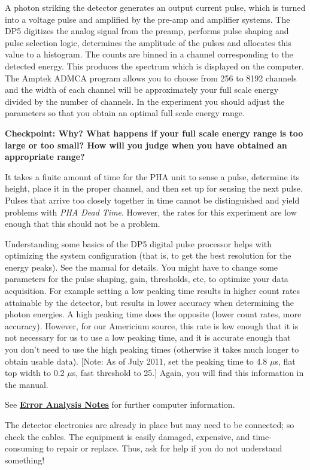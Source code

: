 \documentclass{../lab}
\begin{document}
A photon striking the detector generates an output current pulse, which is turned into a voltage pulse and amplified by the pre-amp and amplifier systems. The DP5 digitizes the analog signal from the preamp, performs pulse shaping and pulse selection logic, determines the amplitude of the pulses and allocates this value to a histogram. The counts are binned in a channel corresponding to the detected energy. This produces the spectrum which is displayed on the computer. The Amptek ADMCA program allows you to choose from 256 to 8192 channels and the width of each channel will be approximately your full scale energy divided by the number of channels. In the experiment you should adjust the parameters so that you obtain an optimal full scale energy range. 

\textbf{Checkpoint: Why? What happens if your full scale energy range is too large or too small? How will you judge when you have obtained an appropriate range?}

It takes a finite amount of time for the PHA unit to sense a pulse, determine its height, place it in the proper channel, and then set up for sensing the next pulse. Pulses that arrive too closely together in time cannot be distinguished and yield problems with \emph{PHA Dead Time}. However, the rates for this experiment are low enough that this should not be a problem.

Understanding some basics of the DP5 digital pulse processor helps with optimizing the system configuration (that is, to get the best resolution for the energy peaks). See the manual for details. You might have to change some parameters for the pulse shaping, gain, thresholds, etc, to optimize your data acquisition. For example setting a low peaking time results in higher count rates attainable by the detector, but results in lower accuracy when determining the photon energies. A high peaking time does the opposite (lower count rates, more accuracy). However, for our Americium source, this rate is low enough that it is not necessary for us to use a low peaking time, and it is accurate enough that you don't need to use the high peaking times (otherwise it takes much longer to obtain usable data). [Note: As of July 2011, set the peaking time to 4.8 $\mu$s, flat top width to 0.2 $\mu$s, fast threshold to 25.] Again, you will find this information in the manual.

See \href{\ErrorAnalysisNotes}{\textbf{\textbf{Error Analysis Notes}}} for further computer information.

The detector electronics are already in place but may need to be connected; so check the cables. The equipment is easily damaged, expensive, and time-consuming to repair or replace. Thus, ask for help if you do not understand something!
\end{document}
